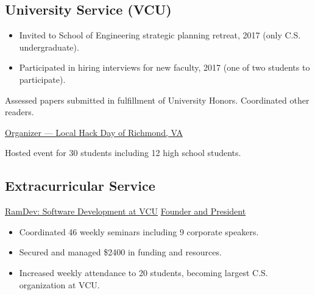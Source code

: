 \documentclass[11pt,letterpaper,serif]{moderncv}
\begin{document}
\subsection{University Service (VCU)}
{
	\begin{adjustwidth}{.25in}{}
		\begin{itemize}%
			\item Invited to School of Engineering strategic planning retreat, 2017 (only C.S. undergraduate).
			\item Participated in hiring interviews for new faculty, 2017 (one of two students to participate).
		\end{itemize}
	\end{adjustwidth}
}

{
	\begin{adjustwidth}{.25in}{}
		Assessed papers submitted in fulfillment of University Honors. Coordinated other readers.
	\end{adjustwidth}
}




{\href{https://localhackday.mlh.io/}{Organizer --- Local Hack Day of Richmond, VA}}
{}{}
{
	\begin{adjustwidth}{.25in}{}
		Hosted event for 30 students including 12 high school students.
	\end{adjustwidth}
}

\subsection{Extracurricular Service}
{\href{https://vcuramdev.github.io/}{RamDev: Software Development at VCU}}
{\href{https://vcuramdev.github.io/}{Founder and President}}
{}{}
{
	\begin{adjustwidth}{.25in}{}
		\begin{itemize}
			\item Coordinated 46 weekly seminars including 9 corporate speakers.
			\item Secured and managed \$2400 in funding and resources.
			\item Increased weekly attendance to 20 students, becoming largest C.S. organization at VCU.
		\end{itemize}
	\end{adjustwidth}
}
\end{document}
